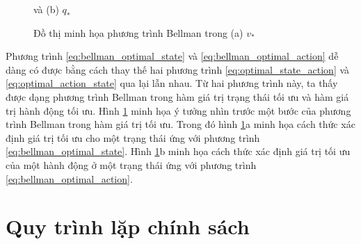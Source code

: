 \begin{figure}
		\caption[Đồ thị minh họa phương trình Bellman trong hàm giá trị tối ưu]{Đồ thị minh họa phương trình Bellman trong (a) $v_{*}$} và (b) $q_{*}$
		\label{fig:bellman_optimal_function}
	\end{figure}
	
	Phương trình \ref{eq:bellman_optimal_state} và \ref{eq:bellman_optimal_action} dễ dàng có được bằng cách thay thế hai phương trình \ref{eq:optimal_state_action} và \ref{eq:optimal_action_state} qua lại lẫn nhau. Từ hai phương trình này, ta thấy được dạng phương trình Bellman trong hàm giá trị trạng thái tối ưu và hàm giá trị hành động tối ưu. Hình \ref{fig:bellman_optimal_function} minh họa ý tưởng nhìn trước một bước của phương trình Bellman trong hàm giá trị tối ưu. Trong đó hình \ref{fig:bellman_optimal_function}a minh họa cách thức xác định giá trị tối ưu cho một trạng thái ứng với phương trình \ref{eq:bellman_optimal_state}. Hình \ref{fig:bellman_optimal_function}b minh họa cách thức xác định giá trị tối ưu của một hành động ở một trạng thái ứng với phương trình \ref{eq:bellman_optimal_action}.
	
\section{Quy trình lặp chính sách}


